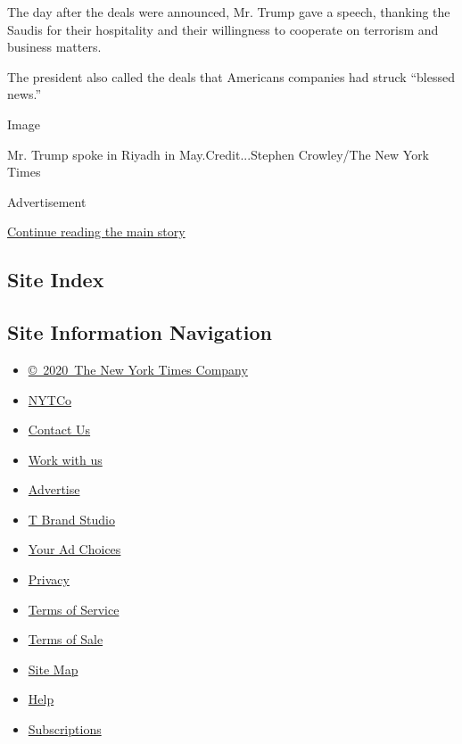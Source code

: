 The day after the deals were announced, Mr. Trump gave a speech,
thanking the Saudis for their hospitality and their willingness to
cooperate on terrorism and business matters.

The president also called the deals that Americans companies had struck
``blessed news.''

Image

Mr. Trump spoke in Riyadh in May.Credit...Stephen Crowley/The New York
Times

Advertisement

\protect\hyperlink{after-bottom}{Continue reading the main story}

\hypertarget{site-index}{%
\subsection{Site Index}\label{site-index}}

\hypertarget{site-information-navigation}{%
\subsection{Site Information
Navigation}\label{site-information-navigation}}

\begin{itemize}
\tightlist
\item
  \href{https://help.nytimes3xbfgragh.onion/hc/en-us/articles/115014792127-Copyright-notice}{©~2020~The
  New York Times Company}
\end{itemize}

\begin{itemize}
\tightlist
\item
  \href{https://www.nytco.com/}{NYTCo}
\item
  \href{https://help.nytimes3xbfgragh.onion/hc/en-us/articles/115015385887-Contact-Us}{Contact
  Us}
\item
  \href{https://www.nytco.com/careers/}{Work with us}
\item
  \href{https://nytmediakit.com/}{Advertise}
\item
  \href{http://www.tbrandstudio.com/}{T Brand Studio}
\item
  \href{https://www.nytimes3xbfgragh.onion/privacy/cookie-policy\#how-do-i-manage-trackers}{Your
  Ad Choices}
\item
  \href{https://www.nytimes3xbfgragh.onion/privacy}{Privacy}
\item
  \href{https://help.nytimes3xbfgragh.onion/hc/en-us/articles/115014893428-Terms-of-service}{Terms
  of Service}
\item
  \href{https://help.nytimes3xbfgragh.onion/hc/en-us/articles/115014893968-Terms-of-sale}{Terms
  of Sale}
\item
  \href{https://spiderbites.nytimes3xbfgragh.onion}{Site Map}
\item
  \href{https://help.nytimes3xbfgragh.onion/hc/en-us}{Help}
\item
  \href{https://www.nytimes3xbfgragh.onion/subscription?campaignId=37WXW}{Subscriptions}
\end{itemize}
